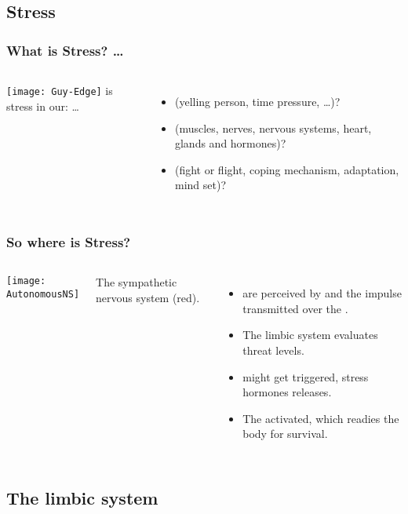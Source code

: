 \documentclass[../main.tex]{subfiles}
\begin{document}
\subsection{Stress}
\begin{frame}
  \frametitle{What is Stress? \ldots}
\begin{columns}[c] %
\texttt{[image: Guy-Edge]}
is stress in our: \ldots 
 \begin{itemize}
 \item {} (yelling person, time pressure, \ldots {})?
 \item  {} (muscles, nerves, nervous systems, heart, glands and hormones)?
 \item  {} (fight or flight, coping mechanism, adaptation, mind set)?
   \end{itemize}
\end{columns}
\end{frame}

\begin{frame}
  \frametitle{So where is Stress?}
\begin{columns}[c] %
\texttt{[image: AutonomousNS]}

\small{The sympathetic nervous system (red).}
 \begin{itemize}
 \item {} are perceived by  and the impulse transmitted over the .
 \item  The \alert{limbic system} evaluates threat levels.
 \item  {} might get triggered, stress hormones releases.
 \item The  activated, which readies the body for survival.
   \end{itemize}
\end{columns}
\end{frame}

\subsection{The limbic system}
\end{document}
